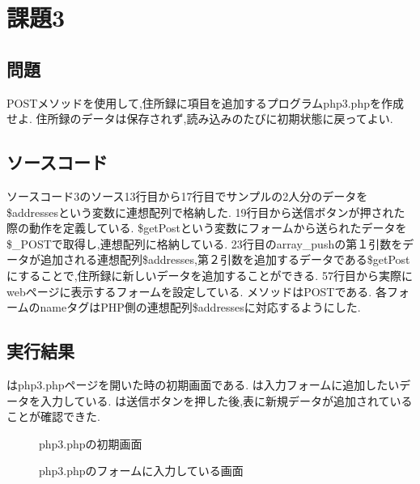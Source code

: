 \documentclass[a4j,10pt]{jsarticle}
\begin{document}

\section{課題3}

\subsection{問題}

POSTメソッドを使用して,住所録に項目を追加するプログラムphp3.phpを作成せよ.
住所録のデータは保存されず,読み込みのたびに初期状態に戻ってよい.

\subsection{ソースコード}


ソースコード3のソース13行目から17行目でサンプルの2人分のデータを\$addressesという変数に連想配列で格納した.
19行目から送信ボタンが押された際の動作を定義している. \$getPostという変数にフォームから送られたデータを\$\_POSTで取得し,連想配列に格納している.
23行目のarray\_pushの第１引数をデータが追加される連想配列\$addresses,第２引数を追加するデータである\$getPostにすることで,住所録に新しいデータを追加することができる.
57行目から実際にwebページに表示するフォームを設定している. メソッドはPOSTである.
各フォームのnameタグはPHP側の連想配列\$addressesに対応するようにした.




\subsection{実行結果}

はphp3.phpページを開いた時の初期画面である.
は入力フォームに追加したいデータを入力している.
は送信ボタンを押した後,表に新規データが追加されていることが確認できた.
\begin{figure}[H]
  \centering
  \caption{php3.phpの初期画面}
\label{fig:fig3}
\end{figure}

\begin{figure}[H]
  \centering
  \caption{php3.phpのフォームに入力している画面}
\label{fig:fig4}
\end{figure}
\end{document}
